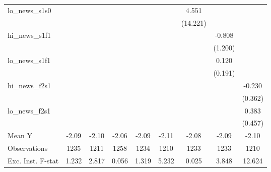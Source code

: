 {\begin{tabular}{l*{8}{c}}
\addlinespace
lo\_news\_s1s0&                     &                     &                     &                     &                     &       4.551         &                     &                     \\
            &                     &                     &                     &                     &                     &    (14.221)         &                     &                     \\
\addlinespace
hi\_news\_s1f1&                     &                     &                     &                     &                     &                     &      -0.808         &                     \\
            &                     &                     &                     &                     &                     &                     &     (1.200)         &                     \\
\addlinespace
lo\_news\_s1f1&                     &                     &                     &                     &                     &                     &       0.120         &                     \\
            &                     &                     &                     &                     &                     &                     &     (0.191)         &                     \\
\addlinespace
hi\_news\_f2s1&                     &                     &                     &                     &                     &                     &                     &      -0.230         \\
            &                     &                     &                     &                     &                     &                     &                     &     (0.362)         \\
\addlinespace
lo\_news\_f2s1&                     &                     &                     &                     &                     &                     &                     &       0.383         \\
            &                     &                     &                     &                     &                     &                     &                     &     (0.457)         \\
\midrule
Mean Y      &       -2.09         &       -2.10         &       -2.06         &       -2.09         &       -2.11         &       -2.08         &       -2.09         &       -2.10         \\
Observations&        1235         &        1211         &        1258         &        1234         &        1210         &        1233         &        1233         &        1210         \\
Exc. Inst. F-stat&       1.232         &       2.817         &       0.056         &       1.319         &       5.232         &       0.025         &       3.848         &      12.624         \\
\bottomrule
\end{tabular}
}
